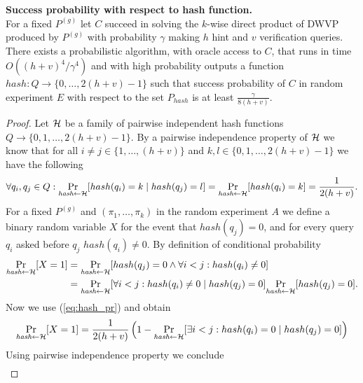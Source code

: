 
\begin{lemma}
\label{lemma:hash_function_probability}
\textbf{Success probability with respect to hash function.} \\
For a fixed $P^{(g)}$ let $C$ succeed in solving the $k$-wise direct product of DWVP produced by $P^{(g)}$
with probability $\gamma$ making $h$ hint and $v$ verification queries.
There exists a probabilistic algorithm, with oracle access to $C$, that runs in time $O((h+v)^4/\gamma^4)$
and with high probability outputs a function $hash: Q \rightarrow \{0, \dots, 2(h+v)-1\}$ such that success probability of
$C$ in random experiment $E$ with respect to the set $P_{hash}$ is at least $\frac{\gamma}{8(h+v)}$.
\end{lemma}
%
%
\begin{proof}
Let $\mathcal{H}$ be a family of pairwise independent hash functions $Q \rightarrow \{0,1, \dots,2(h+v)-1\}$.
By a pairwise independence property of $\mathcal{H}$ we know that for all $i \neq j \in \{1, \dots, (h+v)\}$ and $k,l \in \{0,1,\dots,2(h+v)-1\}$
we have the following
\begin{align}
  \label{eq:hash_pr}
 \forall q_i,q_j \in Q : \underset{\textit{hash} \leftarrow \mathcal{H}}{\Pr}[hash(q_i) = k \mid hash(q_j) = l] = \underset{\textit{hash} \leftarrow \mathcal{H}}{\Pr}[hash(q_i) = k] = \frac{1}{2(h+v)}.
\end{align}
For a fixed $P^{(g)}$ and $(\pi_1, \dots, \pi_k)$ in the random experiment $A$ we define a binary random variable $X$ for the event that $hash(q_j) = 0$, and for
every query $q_i$ asked before $q_j$ $hash(q_i) \neq 0$.
By definition of conditional probability
\begin{align*}
  \underset{\textit{hash} \leftarrow \mathcal{H}}{\Pr}[X=1] &= \underset{\textit{hash} \leftarrow \mathcal{H}}{\Pr}[hash(q_j) = 0 \land \forall i < j : hash(q_i) \neq 0] \\
  &=\underset{\textit{hash} \leftarrow \mathcal{H}}{\Pr}[\forall i < j : hash(q_i) \neq 0 \mid hash(q_j) = 0] \underset{\textit{hash} \leftarrow \mathcal{H}}{\Pr}[hash(q_j) = 0].
\end{align*}
Now we use (\ref{eq:hash_pr}) and obtain
\begin{align*}
\underset{\textit{hash} \leftarrow \mathcal{H}}{\Pr}[X=1] =
\frac{1}{2(h+v)}\left(1 -\underset{\textit{hash} \leftarrow \mathcal{H}}{\Pr}[\exists i < j : hash(q_i) = 0 \mid hash(q_j) = 0] \right)
\end{align*}
Using pairwise independence property we conclude
\begin{align*}

\end{align*}
\end{proof}
